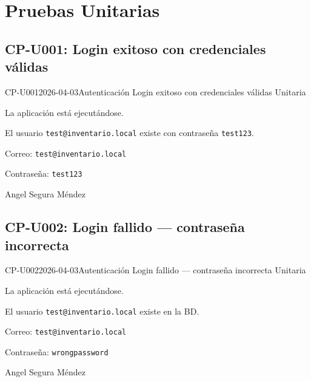\clearpage
\section{Pruebas Unitarias}

\subsection{CP-U001: Login exitoso con credenciales válidas}
\def\cpPasos{%
  \item Abrir la aplicación.
  \item Ingresar correo: \texttt{test@inventario.local}
  \item Ingresar contraseña: \texttt{test123}
  \item Hacer clic en ``Iniciar sesión''.}
\def\cpResultadoE{%
  \item El sistema autentica al usuario y muestra el Dashboard con el menú lateral completo.}
\def\cpResultadoO{La app cargó correctamente. El menú lateral muestra todos los módulos:
  Inicio, Inventario, Ventas, Estadísticas, Usuarios, Reportes, Productos,
  Categorías, Emprendimientos, Emprendedoras, Actividades y Asociación.}
\casoprueba
  {CP-U001}{2026-04-03}{Autenticación}
  {Login exitoso con credenciales válidas}
  {Unitaria}{\estadoAprobado}
  {\item La aplicación está ejecutándose.
   \item El usuario \texttt{test@inventario.local} existe con contraseña \texttt{test123}.}
  {\item Correo: \texttt{test@inventario.local}
   \item Contraseña: \texttt{test123}}
  {Angel Segura Méndez}

\subsection{CP-U002: Login fallido --- contraseña incorrecta}
\def\cpPasos{%
  \item Cerrar sesión.
  \item Ingresar correo: test@inventario.local
  \item Ingresar contraseña: \texttt{wrongpassword}
  \item Hacer clic en ``Iniciar sesión''.}
\def\cpResultadoE{%
  \item El sistema muestra un mensaje de error.
  \item No redirige al dashboard.}
\def\cpResultadoO{El sistema mostró el mensaje: ``el usuario o contraseña son incorrectos''.
  No redirigió al dashboard.}
\casoprueba
  {CP-U002}{2026-04-03}{Autenticación}
  {Login fallido --- contraseña incorrecta}
  {Unitaria}{\estadoAprobado}
  {\item La aplicación está ejecutándose.
   \item El usuario \texttt{test@inventario.local} existe en la BD.}
  {\item Correo: \texttt{test@inventario.local}
   \item Contraseña: \texttt{wrongpassword}}
  {Angel Segura Méndez}

